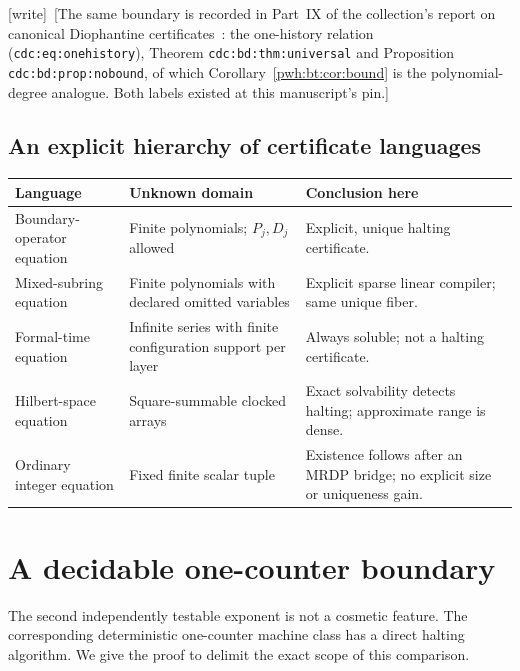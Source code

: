 \documentclass[11pt,letterpaper]{article}
\numberwithin{equation}{section}
\theoremstyle{definition}
\newcommand{\wtag}{\textup{[write]}}
\begin{document}
\wtag\ [The same boundary is recorded in Part~IX of the collection's
report on canonical Diophantine certificates~\cite{cdc}: the one-history
relation (\texttt{cdc:eq:onehistory}), Theorem
\texttt{cdc:bd:thm:universal} and Proposition \texttt{cdc:bd:prop:nobound},
of which Corollary~\ref{pwh:bt:cor:bound} is the polynomial-degree
analogue. Both labels existed at this manuscript's pin.]

\subsection{An explicit hierarchy of certificate languages}
\begin{center}
\begin{tabular}{@{}p{}p{}p{}@{}}
\toprule
Language & Unknown domain & Conclusion here\\
\midrule
Boundary-operator equation & Finite polynomials; $P_j,D_j$ allowed &
Explicit, unique halting certificate.\\[0.4em]
Mixed-subring equation & Finite polynomials with declared omitted variables &
Explicit sparse linear compiler; same unique fiber.\\[0.4em]
Formal-time equation & Infinite series with finite configuration support per layer &
Always soluble; not a halting certificate.\\[0.4em]
Hilbert-space equation & Square-summable clocked arrays &
Exact solvability detects halting; approximate range is dense.\\[0.4em]
Ordinary integer equation & Fixed finite scalar tuple &
Existence follows after an MRDP bridge; no explicit size or uniqueness gain.\\
\bottomrule
\end{tabular}
\end{center}

\section{A decidable one-counter boundary}\label{pwh:bt:sec:onecounter}

The second independently testable exponent is not a cosmetic feature.
The corresponding deterministic one-counter machine class has a direct
halting algorithm. We give the proof to delimit the exact scope of this
comparison.
\end{document}
